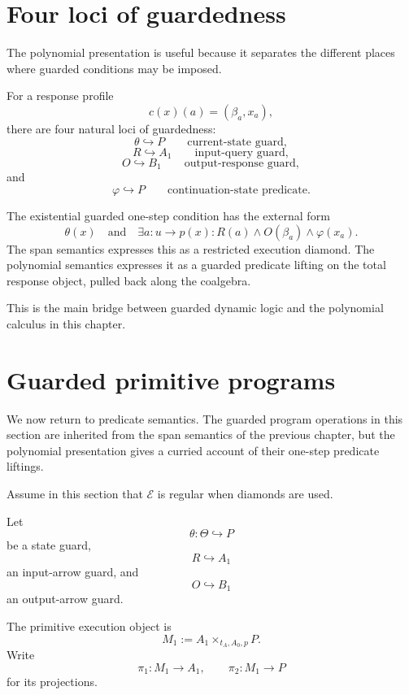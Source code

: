\section{Four loci of guardedness}
\label{sec:four-loci-of-guardedness}

The polynomial presentation is useful because it separates the different
places where guarded conditions may be imposed.

For a response profile
\[
c(x)(a)=(\beta_a,x_a),
\]
there are four natural loci of guardedness:
\[
\theta\hookrightarrow P
\qquad
\text{current-state guard},
\]
\[
R\hookrightarrow A_1
\qquad
\text{input-query guard},
\]
\[
O\hookrightarrow B_1
\qquad
\text{output-response guard},
\]
and
\[
\varphi\hookrightarrow P
\qquad
\text{continuation-state predicate}.
\]

The existential guarded one-step condition has the external form
\[
\theta(x)
\quad\text{and}\quad
\exists a:u\to p(x):
R(a)\wedge O(\beta_a)\wedge\varphi(x_a).
\]
The span semantics expresses this as a restricted execution diamond.
The polynomial semantics expresses it as a guarded predicate lifting on
the total response object, pulled back along the coalgebra.

This is the main bridge between guarded dynamic logic and the polynomial
calculus in this chapter.

\section{Guarded primitive programs}
\label{sec:guarded-primitive-programs}

We now return to predicate semantics. The guarded program operations in
this section are inherited from the span semantics of the previous
chapter, but the polynomial presentation gives a curried account of their
one-step predicate liftings.

Assume in this section that \(\mathcal E\) is regular when diamonds are
used.

Let
\[
\theta:\Theta\hookrightarrow P
\]
be a state guard,
\[
R\hookrightarrow A_1
\]
an input-arrow guard, and
\[
O\hookrightarrow B_1
\]
an output-arrow guard.

The primitive execution object is
\[
M_1:=A_1\times_{t_A,A_0,p}P.
\]
Write
\[
\pi_1:M_1\to A_1,
\qquad
\pi_2:M_1\to P
\]
for its projections.

